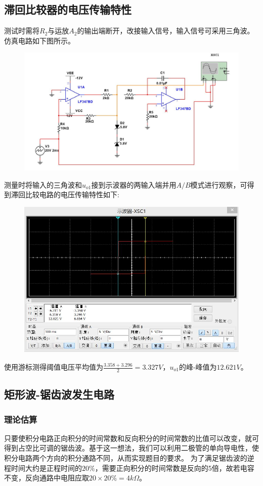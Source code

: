 \documentclass[12pt,a4paper]{article}
\begin{document}
\begin{spacing}{1.3}
\subsection{滞回比较器的电压传输特性}
测试时需将$R_2$与运放$A_2$的输出端断开，改接输入信号，输入信号可采用三角波。仿真电路如下图所示。
\begin{figure}[H]
\centering
\includegraphics[width=\textwidth]{9-1.jpg}
\end{figure}
测量时将输入的三角波和$u_{o1}$接到示波器的两输入端并用$A/B$模式进行观察，可得到滞回比较电路的电压传输特性如下:
\begin{figure}[H]
\centering
\includegraphics[width=\textwidth]{9-2.jpg}
\end{figure}
使用游标测得阈值电压平均值为$\frac{3.358+3.296}{2} = 3.327V$，$u_{o1}$的峰-峰值为$12.621V$。
\subsection{矩形波-锯齿波发生电路}
\subsubsection{理论估算}
只要使积分电路正向积分的时间常数和反向积分的时间常数的比值可以改变，就可得到占空比可调的锯齿波。基于这一想法，我们可以利用二极管的单向导电性，使积分电路两个方向的积分通路不同，从而实现题目的要求。
为了满足锯齿波的逆程时间大约是正程时间的$20\%$，需要正向积分的时间常数是反向的5倍，故若电容不变，反向通路中电阻应取$20\times 20\%=4k\Omega$。

\end{spacing}
\end{document}
